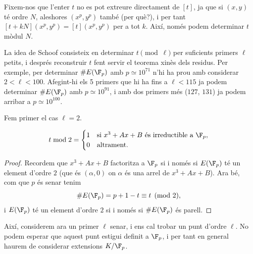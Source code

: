  \begin{remark}
 Fixem-nos que l'enter $t$ no es pot extreure directament de $[t]$, ja que si $(x,y)$ té ordre $N$, aleshores $(x^p,y^p)$ també (per què?), i per tant $[t+kN](x^p,y^p)=[t](x^p,y^p)$ per a tot $k$. Així, només podem determinar $t$ mòdul $N$. 
 \end{remark}
 
 La idea de Schoof consisteix en determinar $t\pmod \ell$ per suficients primers $\ell$ petits, i després reconstruir $t$ fent servir el teorema xinès dels residus. Per exemple, per determinar $\#E(\F_p)$ amb $p\simeq 10^{71}$ n'hi ha prou amb considerar $2<\ell<100$. Afegint-hi els 5 primers que hi ha fins a $\ell < 115$ ja podem determinar $\#E(\F_p)$ amb $p\simeq 10^{91}$, i amb dos primers més ($127$, $131$) ja podem arribar a $p\simeq 10^{100}$.
 
 Fem primer el cas $\ell=2$.
 \begin{lemma}
  \[
  t\bmod 2=\begin{cases}
  1 & \text{si } x^3+Ax+B\text{ és irreductible a } \F_p,\\
  0 & \text{altrament.}
  \end{cases}
  \]
 \end{lemma}
\begin{proof}
 Recordem que $x^3+Ax+B$ factoritza a $\F_p$ si i només si $E(\F_p)$ té un element d'ordre $2$ (que és $(\alpha,0)$ on $\alpha$ és una arrel de $x^3+Ax+B$). Ara bé, com que $p$ és senar tenim
 \[
 \# E(\F_p) = p+1-t\equiv t\pmod 2,
 \]
 i $E(\F_p)$ té un element d'ordre $2$ si i només si $\#E(\F_p)$ és parell.
 \end{proof}
 
 Així, considerem ara un primer $\ell$ senar, i ens cal trobar un punt d'ordre $\ell$. No podem esperar que aquest punt estigui definit a $\F_p$, i per tant en general haurem de considerar extensions $K/\F_p$. 
 
